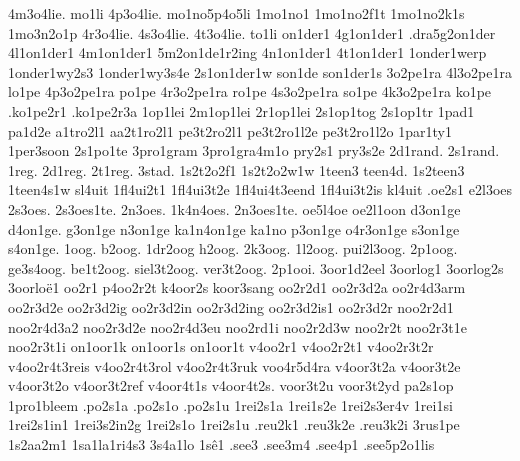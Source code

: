 {4m3o4lie.
mo1li
4p3o4lie.
mo1no5p4o5li
1mo1no1
1mo1no2f1t
1mo1no2k1s
1mo3n2o1p
4r3o4lie.
4s3o4lie.
4t3o4lie.
to1li
%
on1der1
4g1on1der1
.dra5g2on1der
4l1on1der1
4m1on1der1
5m2on1de1r2ing
4n1on1der1
4t1on1der1
%
1onder1werp
1onder1wy2s3
1onder1wy3s4e
2s1on1der1w
son1de
son1der1s
%
3o2pe1ra
4l3o2pe1ra
lo1pe
4p3o2pe1ra
po1pe
4r3o2pe1ra
ro1pe
4s3o2pe1ra
so1pe
4k3o2pe1ra
ko1pe
%
.ko1pe2r1
.ko1pe2r3a
%
1op1lei
2m1op1lei
2r1op1lei
%
2s1op1tog
2s1op1tr
%
1pad1
pa1d2e
%
a1tro2l1
aa2t1ro2l1
pe3t2ro2l1
pe3t2ro1l2e
pe3t2ro1l2o
%
1par1ty1
%
1per3soon
%
2s1po1te
%
3pro1gram
3pro1gra4m1o
%
pry2s1
pry3s2e
%
2d1rand.
2s1rand.
%
1reg.
2d1reg.
2t1reg.
%
3stad.
1s2t2o2f1
1s2t2o2w1w
1teen3
teen4d.
1s2teen3
1teen4s1w
sl4uit
1fl4ui2t1
1fl4ui3t2e
1fl4ui4t3eend
1fl4ui3t2is
kl4uit
%
.oe2s1
e2l3oes
2s3oes.
2s3oes1te.
2n3oes.
1k4n4oes.
2n3oes1te.
oe5l4oe
oe2l1oon
%
d3on1ge
d4on1ge.
g3on1ge
n3on1ge
ka1n4on1ge
ka1no
p3on1ge
o4r3on1ge
s3on1ge
s4on1ge.
%
1oog.
b2oog.
1dr2oog
h2oog.
2k3oog.
1l2oog.
pui2l3oog.
2p1oog.
ge3s4oog.
be1t2oog.
siel3t2oog.
ver3t2oog.
%
2p1ooi.
%
3oor1d2eel
3oorlog1
3oorlog2s
3oorloë1
%
oo2r1
p4oo2r2t
k4oor2s
koor3sang
oo2r2d1
oo2r3d2a
oo2r4d3arm
oo2r3d2e
oo2r3d2ig
oo2r3d2in
oo2r3d2ing
oo2r3d2is1
oo2r3d2r
noo2r2d1
noo2r4d3a2
noo2r3d2e
noo2r4d3eu
noo2rd1i
noo2r2d3w
noo2r2t
noo2r3t1e
noo2r3t1i
%
on1oor1k
on1oor1s
on1oor1t
%
v4oo2r1
v4oo2r2t1
v4oo2r3t2r
v4oo2r4t3reis
v4oo2r4t3rol
v4oo2r4t3ruk
voo4r5d4ra
v4oor3t2a
v4oor3t2e
v4oor3t2o
v4oor3t2ref
v4oor4t1s
v4oor4t2s.
voor3t2u
voor3t2yd
%
pa2s1op
%
1pro1bleem
%
.po2s1a
.po2s1o
.po2s1u
%
1rei2s1a
1rei1s2e
1rei2s3er4v
1rei1si
1rei2s1in1
1rei3s2in2g
1rei2s1o
1rei2s1u
%
.reu2k1
.reu3k2e
.reu3k2i
%
3rus1pe
%
1s2aa2m1
%
1sa1la1ri4s3
%
3s4a1lo
%
1sê1
%
.see3
.see3m4
.see4p1
.see5p2o1lis
}
